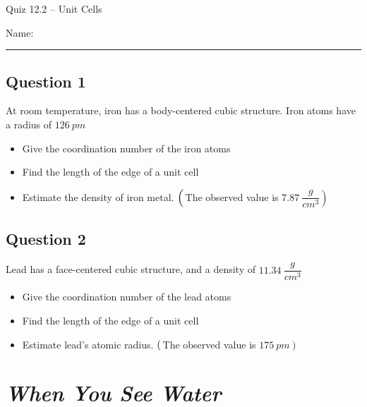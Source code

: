 \documentclass[11pt, letterpaper]{memoir}
\begin{document}
	\begin{center}
		{\large	Quiz 12.2 -- Unit Cells}
	\end{center}
	{\large Name: \rule[-1mm]{4in}{.1pt} 
	
	\subsection*{Question 1}
	At room temperature, iron has a body-centered cubic structure. Iron atoms have a radius of $126~pm$
	\begin{itemize}
		\item Give the coordination number of the iron atoms
		\item Find the length of the edge of a unit cell
		\item Estimate the density of iron metal. $\left(\vphantom{\dfrac{g}{cm^3}}\right.$The observed value is $\left.7.87~\dfrac{g}{cm^3}\right)$
	\end{itemize}
	
	\vspace{13em}
	\subsection*{Question 2}
	Lead has a face-centered cubic structure, and a density of $11.34~\dfrac{g}{cm^3}$
	\begin{itemize}
		\item Give the coordination number of the lead atoms
		\item Find the length of the edge of a unit cell
		\item Estimate lead's atomic radius. $\left(\vphantom{pm}\right.$The observed value is $\left.175~pm\right)$
	\end{itemize}

	\newpage
	\pagestyle{empty}
	\addtocounter{page}{-1}
  \section*{\emph{When You See Water}}
}
\end{document}
